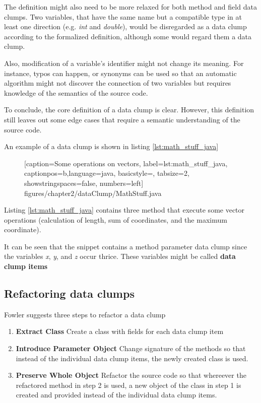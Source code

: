 The definition might also need to be more relaxed for both method and field data clumps. Two variables, that have the same name but a compatible type in at least one direction  (e.g. \textit{int} and  \textit{double}), would be disregarded as a data clump according to the formalized definition, although some would regard them a data clump.

Also, modification of a variable's identifier might not change its meaning. For instance, typos can happen, or synonyms can be used so that an automatic algorithm might not discover the connection of two variables but requires  knowledge of the semantics of the source code. \cite{zhangImprovingPrecisionFowler2008}


To conclude, the core definition of a data clump is clear. However, this definition still leaves out some edge cases that require a semantic understanding of the source code. 

An example of a data clump is shown in listing \ref{lst:math_stuff_java}
\begin{figure} [htbp!]
			
			[caption={Some operations on vectors},
			label={lst:math_stuff_java},
			captionpos=b,language=java, basicstyle=\footnotesize, tabsize=2, showstringspaces=false,  numbers=left]
			{figures/chapter2/dataClump/MathStuff.java}
		\end{figure}



Listing \ref{lst:math_stuff_java} contains three method that execute some vector operations (calculation of length, sum of coordinates, and the maximum coordinate). 


It can be seen that  the snippet contains a method parameter data clump since the variables \textit{x}, \textit{y}, and  \textit{z} occur thrice.  These variables might be called \textbf{data clump items}
  
\subsection{Refactoring data clumps}
Fowler suggests three steps to refactor a data clump
\begin{enumerate}
    \item \textbf{Extract Class} Create a class with fields for each data clump item
    \item \textbf{Introduce Parameter Object} Change signature of the methods so that instead of the individual data clump items, the newly created class is used. 
    \item \textbf{Preserve Whole Object} Refactor the source code so that whereever the refactored method in step 2 is used, a new object of the class in step 1 is created and provided instead of the individual data clump items.
\end{enumerate}


